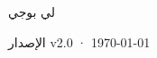 \begin{titlepage}
\vfill
{\LARGE\sffamily لي بوجي\par}
\vspace{0.7cm}
{\small\sffamily\color{structurecolor!80} الإصدار v2.0 · \today\par}
\vspace{1.2cm}
\end{titlepage}
